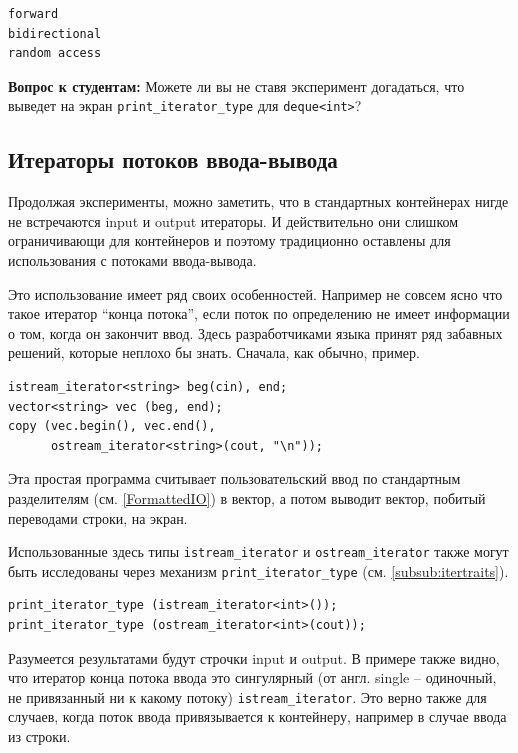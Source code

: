\documentclass[a4paper,12pt,oneside]{book}
\newif\ifanswers
\begin{document}
\begin{verbatim}
forward
bidirectional
random access
\end{verbatim}

\textbf{Вопрос к студентам:} Можете ли вы не ставя эксперимент догадаться, что выведет на экран \lstinline!print_iterator_type! для \lstinline!deque<int>!?

\ifanswers
Разумеется random access. Догадаться можно по наличию у деки оператора квадратные скобки.
\fi

\subsection{Итераторы потоков ввода-вывода}\label{subsub:streamiter}

Продолжая эксперименты, можно заметить, что в стандартных контейнерах нигде не встречаются input и output итераторы. И действительно они слишком ограничивающи для контейнеров и поэтому традиционно оставлены для использования с потоками ввода-вывода.

Это использование имеет ряд своих особенностей. Например не совсем ясно что такое итератор ``конца потока'', если поток по определению не имеет информации о том, когда он закончит ввод. Здесь разработчиками языка принят ряд забавных решений, которые неплохо бы знать. Сначала, как обычно, пример.

\begin{lstlisting}
istream_iterator<string> beg(cin), end;
vector<string> vec (beg, end);
copy (vec.begin(), vec.end(), 
      ostream_iterator<string>(cout, "\n"));
\end{lstlisting}

Эта простая программа считывает пользовательский ввод по стандартным разделителям (см. \ref{FormattedIO}) в вектор, а потом выводит вектор, побитый переводами строки, на экран. 

Использованные здесь типы \lstinline!istream_iterator! и \lstinline!ostream_iterator! также могут быть исследованы через механизм \lstinline!print_iterator_type! (см. \ref{subsub:itertraits}).

\begin{lstlisting}
print_iterator_type (istream_iterator<int>()); 
print_iterator_type (ostream_iterator<int>(cout));
\end{lstlisting}

Разумеется результатами будут строчки input и output. В примере также видно, что итератор конца потока ввода это сингулярный (от англ. single -- одиночный, не привязанный ни к какому потоку) \lstinline!istream_iterator!. Это верно также для случаев, когда поток ввода привязывается к контейнеру, например в случае ввода из строки.
\end{document}

